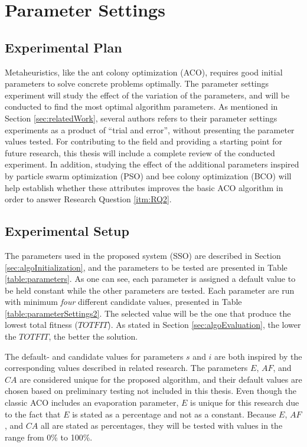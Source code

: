 \section{Parameter Settings}
\label{sec:parametersettings}

\subsection{Experimental Plan}
Metaheuristics, like the ant colony optimization (ACO), requires good initial parameters to solve concrete problems optimally. The parameter settings experiment will study the effect of the variation of the parameters, and will be conducted to find the most optimal algorithm parameters. As mentioned in Section \vref{sec:relatedWork}, several authors refers to their parameter settings experiments as a product of ``trial and error'', without presenting the parameter values tested. For contributing to the field and providing a starting point for future research, this thesis will include a complete review of the conducted experiment. %
In addition, studying the effect of the additional parameters inspired by particle swarm optimization (PSO) and bee colony optimization (BCO) will help establish whether these attributes improves the basic ACO algorithm in order to answer Research Question \vref{itm:RQ2}.

\subsection{Experimental Setup}
\label{subsec:parameterSettings_setup}
The parameters used in the proposed system (SSO) are described in Section \vref{sec:algoInitialization}, and the parameters to be tested are presented in Table \ref{table:parameters}. As one can see, each parameter is assigned a default value to be held constant while the other parameters are tested. Each parameter are run with minimum \textit{four} different candidate values, presented in Table \vref{table:parameterSettings2}. The selected value will be the one that produce the lowest total fitness ($TOTFIT$). As stated in Section \vref{sec:algoEvaluation}, the lower the $TOTFIT$, the better the solution. 

The default- and candidate values for parameters $s$ and $i$ are both inspired by the corresponding values described in related research\citep{salehi-nezhad07, poorzahedy11, sedighpour14, kechagiopoulos14}. The parameters $E$, $AF$, and $CA$ are considered unique for the proposed algorithm, and their default values are chosen based on preliminary testing not included in this thesis. Even though the classic ACO includes an evaporation parameter, $E$ is unique for this research due to the fact that $E$ is stated as a percentage and not as a constant. Because $E$, $AF$, and $CA$ all are stated as percentages, they will be tested with values in the range from 0\% to 100\%. %

